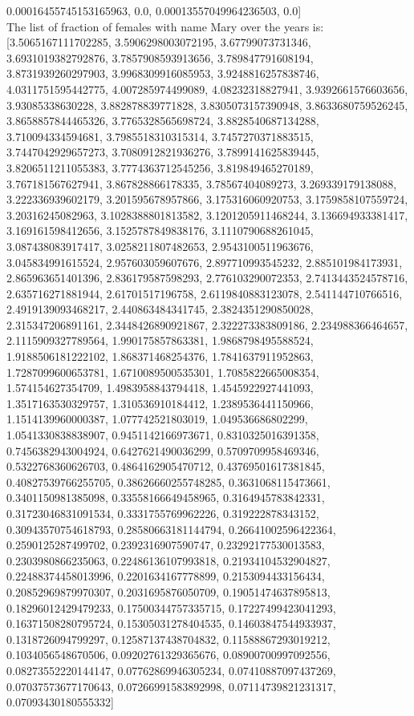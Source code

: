 \documentclass[12pt]{article}%
\begin{document}
0.00016455745153165963, 0.0, 0.00013557049964236503, 0.0]\\
The list of fraction of females with name  Mary  over the years is: [3.5065167111702285, 3.5906298003072195, 3.67799073731346, 3.6931019382792876, 3.7857908593913656, 3.789847791608194, 3.8731939260297903, 3.9968309916085953, 3.9248816257838746, 4.0311751595442775, 4.007285974499089, 4.08232318827941, 3.9392661576603656, 3.93085338630228, 3.882878839771828, 3.8305073157390948, 3.8633680759526245, 3.8658857844465326, 3.7765328565698724, 3.8828540687134288, 3.710094334594681, 3.7985518310315314, 3.7457270371883515, 3.7447042929657273, 3.7080912821936276, 3.7899141625839445, 3.8206511211055383, 3.7774363712545256, 3.819849465270189, 3.767181567627941, 3.867828866178335, 3.78567404089273, 3.269339179138088, 3.222336939602179, 3.201595678957866, 3.175316060920753, 3.1759858107559724, 3.20316245082963, 3.1028388801813582, 3.1201205911468244, 3.136694933381417, 3.169161598412656, 3.1525787849838176, 3.1110790688261045, 3.087438083917417, 3.0258211807482653, 2.9543100511963676, 3.045834991615524, 2.957603059607676, 2.897710993545232, 2.885101984173931, 2.865963651401396, 2.836179587598293, 2.776103290072353, 2.7413443524578716, 2.635716271881944, 2.61701517196758, 2.6119840883123078, 2.541144710766516, 2.4919139093468217, 2.440863484341745, 2.3824351290850028, 2.315347206891161, 2.3448426890921867, 2.322273383809186, 2.234988366464657, 2.1115909327789564, 1.990175857863381, 1.9868798495588524, 1.9188506181222102, 1.868371468254376, 1.7841637911952863, 1.7287099600653781, 1.6710089500535301, 1.7085822665008354, 1.574154627354709, 1.4983958843794418, 1.4545922927441093, 1.3517163530329757, 1.310536910184412, 1.2389536441150966, 1.1514139960000387, 1.077742521803019, 1.049536686802299, 1.0541330838838907, 0.9451142166973671, 0.8310325016391358, 0.7456382943004924, 0.6427621490036299, 0.5709709958469346, 0.5322768360626703, 0.4864162905470712, 0.43769501617381845, 0.40827539766255705, 0.38626660255748285, 0.3631068115473661, 0.3401150981385098, 0.33558166649458965, 0.3164945783842331, 0.31723046831091534, 0.3331755769962226, 0.319222878343152, 0.30943570754618793, 0.28580663181144794, 0.26641002596422364, 0.2590125287499702, 0.2392316907590747, 0.23292177530013583, 0.2303980866235063, 0.22486136107993818, 0.21934104532904827, 0.22488374458013996, 0.2201634167778899, 0.2153094433156434, 0.20852969879970307, 0.2031695876050709, 0.19051474637895813, 0.18296012429479233, 0.17500344757335715, 0.17227499423041293, 0.16371508280795724, 0.15305031278404535, 0.14603847544933937, 0.1318726094799297, 0.12587137438704832, 0.11588867293019212, 0.1034056548670506, 0.09202761329365676, 0.08900700997092556, 0.08273552220144147, 0.07762869946305234, 0.07410887097437269, 0.07037573677170643, 0.07266991583892998, 0.07114739821231317, 0.07093430180555332]
\end{document}
